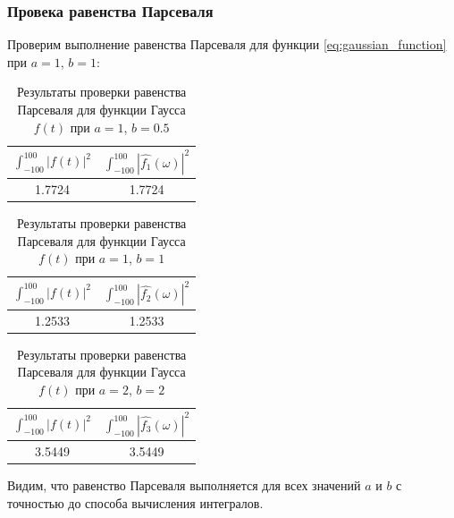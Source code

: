 \FloatBarrier
\subsubsection{Провека равенства Парсеваля}
Проверим выполнение равенства Парсеваля для функции \eqref{eq:gaussian_function} при $a = 1$, $b = 1$:
\begin{table}[ht!]
    \centering
    \begin{tabular}{|c|c|}
        \hline
        $\displaystyle\int_{-100}^{100}{|f(t)|^2}$ & $\displaystyle\int_{-100}^{100}{|\hat{f_1}(\omega)|^2}$ \\
        \hline
        1.7724 & 1.7724 \\
        \hline
    \end{tabular}
    \caption{Результаты проверки равенства Парсеваля для функции Гаусса $f(t)$ при $a = 1$, $b = 0.5$}
    \label{tab:gaussian_1_parseval_check}
\end{table}

\begin{table}
    \centering
    \begin{tabular}{|c|c|}
        \hline
        $\displaystyle\int_{-100}^{100}{|f(t)|^2}$ & $\displaystyle\int_{-100}^{100}{|\hat{f_2}(\omega)|^2}$ \\
        \hline
        1.2533 & 1.2533 \\
        \hline
    \end{tabular}
    \caption{Результаты проверки равенства Парсеваля для функции Гаусса $f(t)$ при $a = 1$, $b = 1$}
    \label{tab:gaussian_2_parseval_check}
\end{table}

\begin{table}
    \centering
    \begin{tabular}{|c|c|}
        \hline
        $\displaystyle\int_{-100}^{100}{|f(t)|^2}$ & $\displaystyle\int_{-100}^{100}{|\hat{f_3}(\omega)|^2}$ \\
        \hline
        3.5449 & 3.5449 \\
        \hline
    \end{tabular}
    \caption{Результаты проверки равенства Парсеваля для функции Гаусса $f(t)$ при $a = 2$, $b = 2$}
    \label{tab:gaussian_3_parseval_check}
\end{table}

Видим, что равенство Парсеваля выполняется для всех значений $a$ и $b$ с точностью до способа вычисления интегралов.

